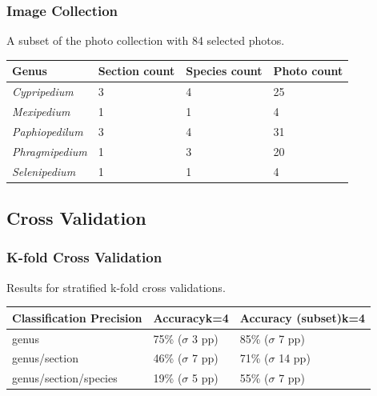 \documentclass[]{beamer}
\begin{document}
    \begin{frame}[plain]
        \frametitle{Image Collection}

        A subset of the photo collection with 84 selected photos.

        \begin{table}[h]\scriptsize
            \begin{center}
            \begin{tabular}{llll}
            \toprule
            \textbf{Genus} & \textbf{Section count} & \textbf{Species count} & \textbf{Photo count} \\
            \midrule
            \textit{Cypripedium} & 3 & 4 & 25 \\
            \textit{Mexipedium} & 1 & 1 & 4 \\
            \textit{Paphiopedilum} & 3 & 4 & 31 \\
            \textit{Phragmipedium} & 1 & 3 & 20 \\
            \textit{Selenipedium} & 1 & 1 & 4 \\
            \bottomrule
            \end{tabular}
            \end{center}
        \end{table}
    \end{frame}

    \subsection{Cross Validation}

    \begin{frame}
        \frametitle{K-fold Cross Validation}

        Results for stratified k-fold cross validations.

        \begin{table}[h]\scriptsize
            \begin{center}
            \begin{tabular}{lp{3cm}p{3cm}}
            \toprule
            \textbf{Classification Precision} & \textbf{Accuracy{\newline}k=4} & \textbf{Accuracy (subset){\newline}k=4} \\
            \midrule
            genus                   & 75\% ({$\sigma$} 3 pp)    & 85\% ({$\sigma$} 7 pp) \\
            genus/section           & 46\% ({$\sigma$} 7 pp)    & 71\% ({$\sigma$} 14 pp) \\
            genus/section/species   & 19\% ({$\sigma$} 5 pp)    & 55\% ({$\sigma$} 7 pp) \\
            \bottomrule
            \end{tabular}
            \end{center}
        \end{table}
    \end{frame}
\end{document}
